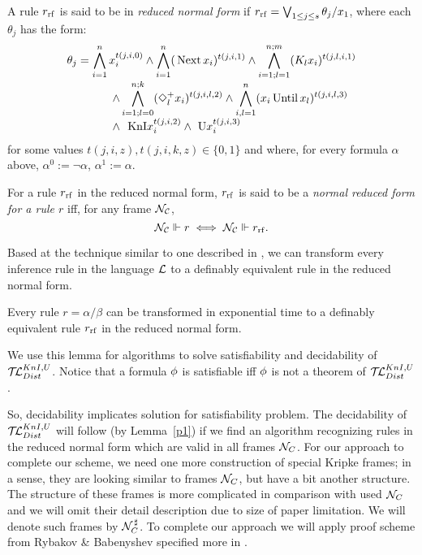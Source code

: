 \documentclass[runningheads]{llncs}
\begin{document}
 A rule ${r}_{\mathrm{rf}}$  is said to be in
\emph{reduced normal form} if
${r}_{\mathrm{rf}}= \bigvee_{1\leq j \leq s}\theta_j / x_1$,
where each $\theta_j$ has the form:
$$
\begin{array}{l}
\displaystyle
\theta_j =
 \bigwedge_{i=1}^n
  x_i^{t(j,i,0)}
  \wedge
 \bigwedge_{i=1}^n
  (\,\mathrm{Next}\, x_i)^{t(j,i,1)}
  \wedge
 \bigwedge_{i=1;l=1}^{n;m}
   (K_l x_i)^{t(j,l,i,1)}
  \\[0.5em]
  \hskip4em
\displaystyle
  \wedge
 \bigwedge_{i=1;l=0}^{n;k}
  (\Diamond^+_l x_i)^{t(j,i,l,2)}
  \wedge
 \bigwedge_{i,l=1}^n
  (x_i \,\mathrm{Until}\, x_l)^{t(j,i,l,3)}
  \\[0.5em]
  \hskip4em
\displaystyle
  \wedge ~~\mbox{KnI} x_i^{t(j,i,2)} \wedge ~\mbox{U} x_i^{t(j,i,3)}
\end{array}
$$
for some values $t(j,i,z), t(j,i,k,z)\in \{0,1\}$
and where, for every formula $\alpha$ above,
 $\alpha^0:=\neg\alpha$, $\alpha^1:= \alpha$.


For a rule ${r}_{\mathrm{rf}}$ in the reduced normal form,
${r}_{\mathrm{rf}}$
is said to be a \emph{normal reduced form for a rule $r$} iff,
for any frame $\mathcal{N_C}$,
\[\mathcal{N_C} \Vdash r
\iff \mathcal{N_C} \Vdash {r}_{\mathrm{rf}}.\]

  Based at  the technique similar to one described in
  \cite[Section~3.1]{ry97}, we can transform
  every inference rule in the language $\mathcal{L}$
to a definably equivalent rule in the reduced normal form.

\begin{lemma}
\label{mt3}
 Every rule $r=\alpha/\beta$ can be transformed in exponential time
 to a definably equivalent
 rule ${r}_{\mathrm{rf}}$ in the reduced normal form.
\end{lemma}


We use this lemma for algorithms to solve satisfiability and decidability of $\mathcal{T\!L}^{KnI,U}_{Dist}$.
Notice that a formula $\phi$ is satisfiable iff $\phi$ is not a theorem of $\mathcal{T\!L}^{KnI,U}_{Dist}$.

So, decidability implicates solution for satisfiability problem.
The decidability of $\mathcal{T\!L}^{KnI,U}_{Dist}$ will follow (by Lemma~\ref{p1}) if we
 find an algorithm recognizing rules in the
reduced normal form which are valid in all frames $\mathcal{N}_C$.
For our
approach to complete our scheme, we need  one more construction of
special Kripke frames; in a sense, they are looking similar to
frames $\mathcal{N}_C$, but have a bit another structure.
The structure of these frames is more complicated in comparison with used $\mathcal{N}_C$ and we will omit their detail description
due to size of paper limitation.
 We will denote such frames by
$\mathcal{N}^{\,\sharp}_C$. To complete our approach we will  apply proof scheme from Rybakov \& Babenyshev
\cite{vris} specified more in  \cite{DBLP:journals/logcom/Rybakov09}.
 
\end{document}
